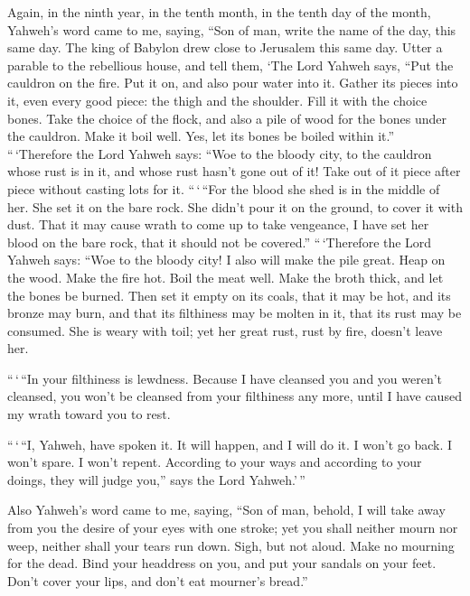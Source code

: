  Again, in the ninth year, in the tenth month, in the
tenth day of the month, Yahweh's word came to me, saying, 
``Son of man, write the name of the day, this same day. The king of
Babylon drew close to Jerusalem this same day.  Utter a
parable to the rebellious house, and tell them, `The Lord Yahweh says,
``Put the cauldron on the fire. Put it on, and also pour water into it.
 Gather its pieces into it, even every good piece: the
thigh and the shoulder. Fill it with the choice bones. 
Take the choice of the flock, and also a pile of wood for the bones
under the cauldron. Make it boil well. Yes, let its bones be boiled
within it.''  ``\,`Therefore the Lord Yahweh says: ``Woe
to the bloody city, to the cauldron whose rust is in it, and whose rust
hasn't gone out of it! Take out of it piece after piece without casting
lots for it.  ``\,`\,``For the blood she shed is in the
middle of her. She set it on the bare rock. She didn't pour it on the
ground, to cover it with dust.  That it may cause wrath to
come up to take vengeance, I have set her blood on the bare rock, that
it should not be covered.''  ``\,`Therefore the Lord
Yahweh says: ``Woe to the bloody city! I also will make the pile great.
 Heap on the wood. Make the fire hot. Boil the meat well.
Make the broth thick, and let the bones be burned.  Then
set it empty on its coals, that it may be hot, and its bronze may burn,
and that its filthiness may be molten in it, that its rust may be
consumed.  She is weary with toil; yet her great rust,
rust by fire, doesn't leave her.

 ``\,`\,``In your filthiness is lewdness. Because I have
cleansed you and you weren't cleansed, you won't be cleansed from your
filthiness any more, until I have caused my wrath toward you to rest.

 ``\,`\,``I, Yahweh, have spoken it. It will happen, and
I will do it. I won't go back. I won't spare. I won't repent. According
to your ways and according to your doings, they will judge you,'' says
the Lord Yahweh.'\,''

 Also Yahweh's word came to me, saying, 
``Son of man, behold, I will take away from you the desire of your eyes
with one stroke; yet you shall neither mourn nor weep, neither shall
your tears run down.  Sigh, but not aloud. Make no
mourning for the dead. Bind your headdress on you, and put your sandals
on your feet. Don't cover your lips, and don't eat mourner's bread.''

